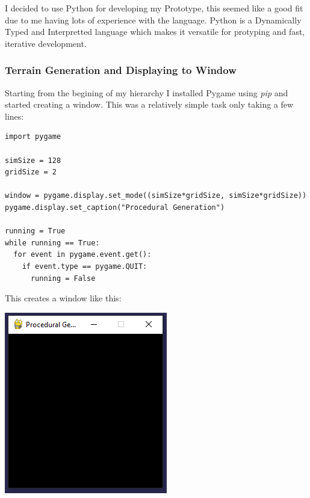 \begin{flushleft}
            I decided to use Python for developing my Prototype, this seemed like a good fit due to me 
            having lots of experience with the language. Python is a Dynamically Typed and Interpretted 
            language which makes it versatile for protyping and fast, iterative development.
            
            \vspace{0.5cm}

            \subsubsection{Terrain Generation and Displaying to Window}
            \vspace{0.25cm}

            Starting from the begining of my hierarchy I installed Pygame using \textit{pip} and started creating a window.
            This was a relatively simple task only taking a few lines:
            \vspace{0.5cm}

            \normalsize
            \begin{verbatim}
import pygame

simSize = 128
gridSize = 2

window = pygame.display.set_mode((simSize*gridSize, simSize*gridSize))
pygame.display.set_caption("Procedural Generation")

running = True
while running == True:
  for event in pygame.event.get():
    if event.type == pygame.QUIT:
      running = False
            \end{verbatim}

            \vspace{0.5cm}

            \large
            This creates a window like this: \\ 
            \vspace{0.5cm}
            \centerline{\includegraphics{Images/Prototype/CreateWindowExample.PNG}}


\end{flushleft}
